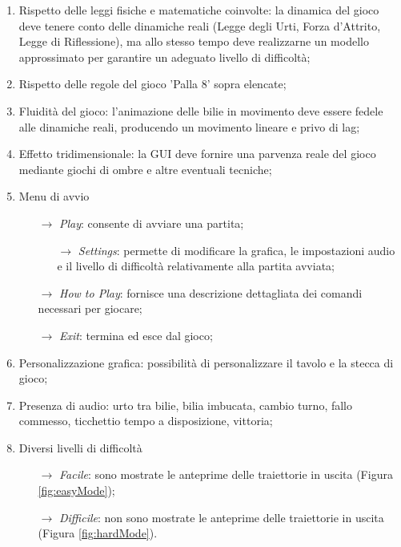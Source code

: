 \documentclass[12pt,a4paper]{report}
\begin{document}
\begin{enumerate}
    \item Rispetto delle leggi fisiche e matematiche coinvolte: la dinamica del gioco deve tenere conto delle dinamiche reali (Legge degli Urti, Forza d'Attrito, Legge di Riflessione), ma allo stesso tempo deve realizzarne un modello approssimato per garantire un adeguato livello di difficoltà;
    \item Rispetto delle regole del gioco 'Palla 8' sopra elencate;
    \item Fluidità del gioco: l'animazione delle bilie in movimento deve essere fedele alle dinamiche reali, producendo un movimento lineare e privo di lag;
    \item Effetto tridimensionale: la GUI deve fornire una parvenza reale del gioco mediante giochi di ombre e altre eventuali tecniche;
    \item Menu di avvio
    \begin{itemize}
        \item[$\rightarrow$] \emph{Play}: consente di avviare una partita;
        \begin{itemize}
        	\item[$\rightarrow$] \emph{Settings}: permette di modificare la grafica, le impostazioni audio e il livello di difficoltà relativamente alla partita avviata;
        \end{itemize}
        \item[$\rightarrow$] \emph{How to Play}: fornisce una descrizione dettagliata dei comandi necessari per giocare;
        \item[$\rightarrow$] \emph{Exit}: termina ed esce dal gioco;
    \end{itemize}
    \item Personalizzazione grafica: possibilità di personalizzare il tavolo e la stecca di gioco;
    \item Presenza di audio: urto tra bilie, bilia imbucata, cambio turno, fallo commesso, ticchettio tempo a disposizione, vittoria;
   	\pagebreak
    \item Diversi livelli di difficoltà
    \begin{itemize}
        \item[$\rightarrow$] \emph{Facile}: sono mostrate le anteprime delle traiettorie in uscita (Figura \ref{fig:easyMode});
        \item[$\rightarrow$] \emph{Difficile}: non sono mostrate le anteprime delle traiettorie in uscita (Figura \ref{fig:hardMode}).
    \end{itemize}
\end{enumerate}
\end{document}
